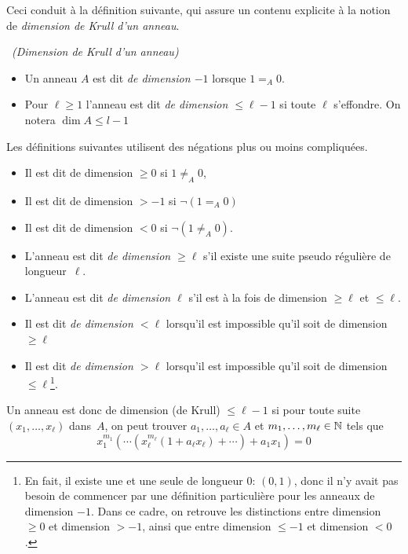 Ceci conduit à la définition suivante, qui assure un contenu \cof 
explicite à la notion de {\em dimension de Krull d'un anneau}.
\begin{definition}{\rm  
\label{def.dimKrull}~{\em (Dimension de Krull d'un anneau)} 
\begin{itemize}
\item  Un anneau $A$ est dit {\em de dimension $-1$} lorsque $1=_A0$. 
%
\item  Pour $\ell\geq 1$ l'anneau est dit {\em de dimension $\leq \ell-1$} si toute \proelo  $\ell$ s'effondre. On notera $\dim A\leq l-1$
\end{itemize}
%
Les définitions suivantes utilisent des négations plus ou moins compliquées.
%
\begin{itemize}
\item  Il 
est dit de dimension $\geq 0$ si  $1\neq_A0$, 
\item  Il 
est dit de dimension $>-1$ si  $\lnot(1=_A0)$
\item  Il 
est dit de dimension  
$<0$ si  $\lnot(1\neq_A0)$.  
\item  L'anneau est dit {\em de dimension $\geq \ell$} s'il existe une 
suite pseudo régulière de longueur~$\ell$. 
\item  L'anneau est dit {\em de dimension $\ell$} s'il est à la fois de 
dimension $\ge\ell$ et $\le\ell$.  
\item  Il est dit {\em  de dimension $<\ell$ } lorsqu'il est impossible 
qu'il soit de dimension 
$\geq \ell$ 
\item  Il est dit {\em  de dimension $>\ell$ } lorsqu'il est impossible 
qu'il soit de dimension 
$\leq \ell$\footnote{En fait, il existe une et une seule \proel de longueur 
$0$: $(0,1)$, donc il n'y avait pas besoin de commencer
par une définition particulière pour les anneaux de dimension $-1$. 
Dans ce cadre, on retrouve les distinctions entre dimension $\ge 0$ et 
dimension $>-1$, ainsi que  entre dimension $\le -1$ et dimension 
$<0$.}.
\end{itemize}
}
\end{definition}


Un anneau est donc de dimension (de Krull) $\leq \ell-1$ si pour toute 
suite  $(x_1,\ldots,x_\ell)$ dans~$A$, on peut trouver   
$a_1,\ldots,a_\ell\in A$ et  $m_1,\ldots,m_\ell\in \mathbb{N}$ tels que
$$ x_1^{m_1}(\cdots(x_\ell^{m_\ell}(1+a_\ell x_\ell)+\cdots)+a_1x_1)=  0
$$

